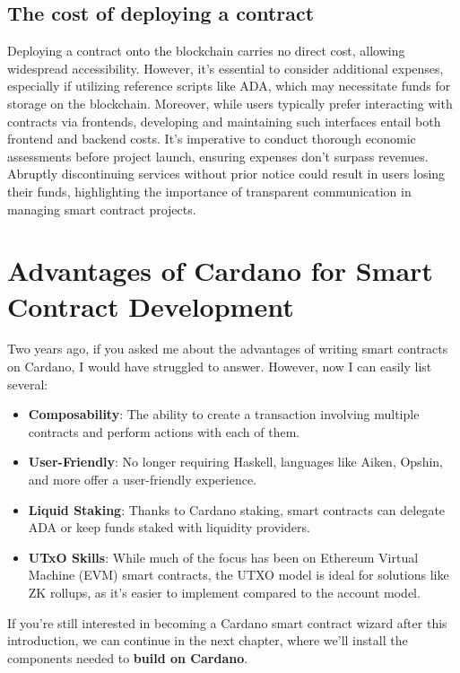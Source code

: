 \subsection{The cost of deploying a contract}

Deploying a contract onto the blockchain carries no direct cost, allowing widespread accessibility. However, it's essential to consider additional expenses, especially if utilizing reference scripts like ADA, which may necessitate funds for storage on the blockchain. Moreover, while users typically prefer interacting with contracts via frontends, developing and maintaining such interfaces entail both frontend and backend costs. It's imperative to conduct thorough economic assessments before project launch, ensuring expenses don't surpass revenues. Abruptly discontinuing services without prior notice could result in users losing their funds, highlighting the importance of transparent communication in managing smart contract projects.
\section{Advantages of Cardano for Smart Contract Development}

Two years ago, if you asked me about the advantages of writing smart contracts on Cardano, I would have struggled to answer. However, now I can easily list several:

\begin{itemize}
\item \textbf{\gls{Composability}}: The ability to create a transaction involving multiple contracts and perform actions with each of them.
\item \textbf{User-Friendly}: No longer requiring Haskell, languages like Aiken, Opshin, and more offer a user-friendly experience.
\item \textbf{\gls{Liquid Staking}}: Thanks to Cardano staking, smart contracts can delegate ADA or keep funds staked with liquidity providers.
\item \textbf{UTxO Skills}: While much of the focus has been on Ethereum Virtual Machine (EVM) smart contracts, the UTXO model is ideal for solutions like ZK rollups, as it's easier to implement compared to the account model.
\end{itemize}

If you're still interested in becoming a Cardano smart contract wizard after this introduction, we can continue in the next chapter, where we'll install the components needed to \textbf{build on Cardano}.